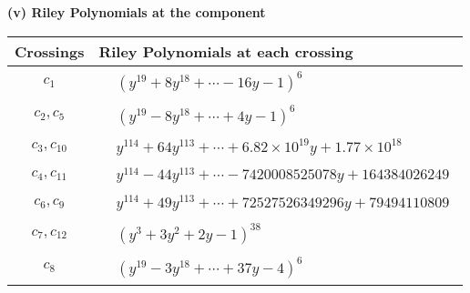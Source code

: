 \documentclass[1p]{elsarticle_modified}
\theoremstyle{definition}
\begin{document}
\newpage\renewcommand{\arraystretch}{1}
\flushleft \textbf{(v) Riley Polynomials at the component}\newline \\
\begin{tabular}{m{50pt}|m{274pt}}
Crossings & \hspace{64pt}Riley Polynomials at each crossing \\
\hline $$\begin{aligned}c_{1}\end{aligned}$$&$\begin{aligned}
&(y^{19}+8 y^{18}+\cdots-16 y-1)^{6}
\end{aligned}$\\
\hline $$\begin{aligned}c_{2},c_{5}\end{aligned}$$&$\begin{aligned}
&(y^{19}-8 y^{18}+\cdots+4 y-1)^{6}
\end{aligned}$\\
\hline $$\begin{aligned}c_{3},c_{10}\end{aligned}$$&$\begin{aligned}
&y^{114}+64 y^{113}+\cdots+6.82\times10^{19} y+1.77\times10^{18}
\end{aligned}$\\
\hline $$\begin{aligned}c_{4},c_{11}\end{aligned}$$&$\begin{aligned}
&y^{114}-44 y^{113}+\cdots-7420008525078 y+164384026249
\end{aligned}$\\
\hline $$\begin{aligned}c_{6},c_{9}\end{aligned}$$&$\begin{aligned}
&y^{114}+49 y^{113}+\cdots+72527526349296 y+79494110809
\end{aligned}$\\
\hline $$\begin{aligned}c_{7},c_{12}\end{aligned}$$&$\begin{aligned}
&(y^3+3 y^2+2 y-1)^{38}
\end{aligned}$\\
\hline $$\begin{aligned}c_{8}\end{aligned}$$&$\begin{aligned}
&(y^{19}-3 y^{18}+\cdots+37 y-4)^{6}
\end{aligned}$\\
\hline
\end{tabular}\\~\\
\end{document}
